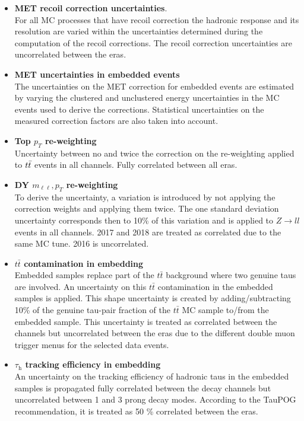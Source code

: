 \begin{itemize}
\item {\bf MET recoil correction uncertainties}. \\
For all MC processes that have recoil correction the hadronic response and its resolution
are varied within the uncertainties determined during the computation of the recoil corrections.
The recoil correction uncertainties are uncorrelated between the eras.

\item {\bf MET uncertainties in embedded events} \\
The uncertainties on the MET correction for embedded events are estimated by varying the clustered and unclustered energy uncertainties in the MC events used to derive the corrections. Statistical uncertainties on the measured correction factors are also taken into account.

\item {\bf Top $p_{T}$ re-weighting} \\
Uncertainty between no and twice the correction on the re-weighting applied to $t\bar{t}$ events in all channels. Fully correlated between all eras.

\item {\bf DY $m_{\ell\ell}, p_{T}$ re-weighting} \\
To derive the uncertainty, a variation is introduced by not applying the correction weights and applying them twice. The one standard deviation uncertainty corresponds then to 10\% of this variation and is applied to $Z\rightarrow ll$ events in all channels. 2017 and 2018 are treated as correlated due to the same MC tune. 2016 is uncorrelated.


\item {\bf $t\bar{t}$ contamination in embedding} \\
Embedded samples replace part of the $t\bar{t}$ background where two genuine taus are involved.
An uncertainty on this $t\bar{t}$ contamination in the embedded samples is applied.
This shape uncertainty is created by adding/subtracting 10\% of the genuine tau-pair fraction of the $t\bar{t}$ MC sample to/from the embedded sample.
This uncertainty is treated as correlated between the channels but uncorrelated between the eras
due to the different double muon trigger menus for the selected data events.

\item {\bf $\tau_\mathrm{h}$ tracking efficiency in embedding} \\
An uncertainty on the tracking efficiency of hadronic taus in the embedded samples is propagated fully correlated between the decay channels but uncorrelated between 1 and 3 prong decay modes.
According to the TauPOG recommendation, it is treated as 50 \% correlated between the eras.


\end{itemize}
